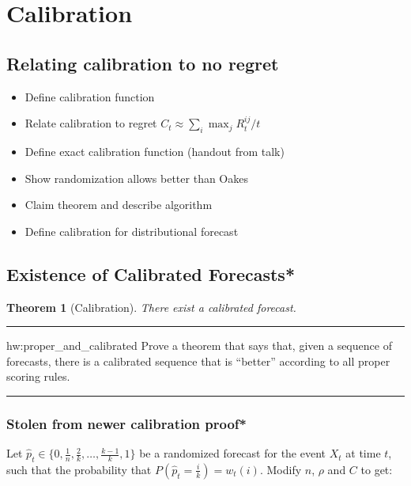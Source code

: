 \documentclass{book}
\newcommand{\gray}{  }
\newcommand{\white}{  }
\newtheorem{theorem}{Theorem}[chapter]
\newenvironment{textHW}{
  \noindent\rule{\textwidth}{1pt}%
  \begin{list}{}{
      \setlength{\labelwidth}{1cm}
      \setlength{\labelsep}{0.3cm}
      \setlength{\leftmargin}{1.3cm}
      \setlength{\rightmargin}{1cm}
      \setlength{\parsep}{0.5ex plus0.2ex minus0.1ex}
      \setlength{\topsep}{1pt plus3pt minus1pt}
      \setlength{\itemsep}{0ex plus0.2ex} 
      \renewcommand{\makelabel}[1]{\label{thw:##1}{\ref{##1}}}
      \sl}}%
  {\end{list}\rule{\textwidth}{1pt}}
\newcommand{\notes}{\index{personal notes}}
\begin{document}
\white
    \section{Calibration} \label{sec:calibration}

        \subsection{Relating calibration to no regret}

\begin{itemize}
        \item Define calibration function

        \item Relate calibration to regret $C_t \approx \sum_i \max_j
          R^{ij}_t/t$ 
        \item Define exact calibration function (handout from talk)
        \item Show randomization allows better than Oakes
        \item Claim theorem and describe algorithm
        \item Define calibration for distributional forecast
\end{itemize}

\gray
        \subsection[Existence*]{Existence of Calibrated Forecasts*}


\begin{theorem}[Calibration] There exist a calibrated forecast.
\end{theorem}
 
\begin{textHW}
\item[hw:proper_and_calibrated] {\notes Prove a theorem that says that,
    given a sequence of forecasts, there is a calibrated sequence that
    is ``better'' according to all proper scoring rules.}
\end{textHW}
 
            \subsubsection{Stolen from newer calibration proof*}  

%

Let $\hat{p}_t \in \{0,\frac{1}{n}, \frac{2}{k}, \ldots,
\frac{k-1}{k},1\}$ be a randomized forecast for the event $X_t$ at
time $t$, such that the probability that $P(\hat{p}_t = \frac{i}{k}) =
w_t(i)$.  Modify $n$, $\rho$ and $C$ to get:
\end{document}
